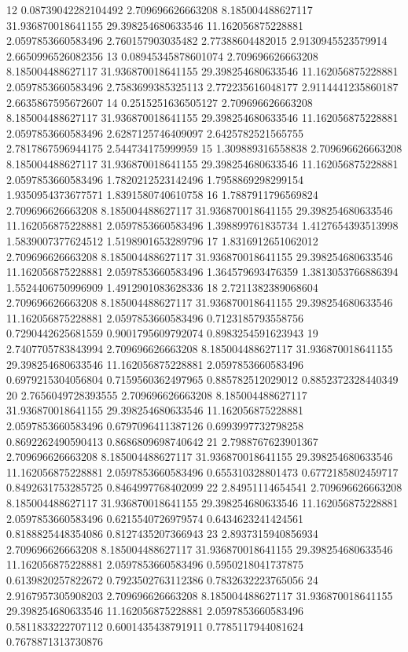 {12 0.08739042282104492 2.709696626663208 8.185004488627117 31.936870018641155 29.398254680633546 11.162056875228881 2.0597853660583496 2.760157903035482 2.77388604482015 2.9130945523579914 2.6650996526082356
13 0.08945345878601074 2.709696626663208 8.185004488627117 31.936870018641155 29.398254680633546 11.162056875228881 2.0597853660583496 2.7583699385325113 2.772235616048177 2.9114441235860187 2.6635867595672607
14 0.2515251636505127 2.709696626663208 8.185004488627117 31.936870018641155 29.398254680633546 11.162056875228881 2.0597853660583496 2.6287125746409097 2.6425782521565755 2.7817867596944175 2.544734175999959
15 1.309889316558838 2.709696626663208 8.185004488627117 31.936870018641155 29.398254680633546 11.162056875228881 2.0597853660583496 1.7820212523142496 1.7958869298299154 1.9350954373677571 1.8391580740610758
16 1.7887911796569824 2.709696626663208 8.185004488627117 31.936870018641155 29.398254680633546 11.162056875228881 2.0597853660583496 1.398899761835734 1.4127654393513998 1.5839007377624512 1.5198901653289796
17 1.8316912651062012 2.709696626663208 8.185004488627117 31.936870018641155 29.398254680633546 11.162056875228881 2.0597853660583496 1.364579693476359 1.3813053766886394 1.5524406750996909 1.4912901083628336
18 2.7211382389068604 2.709696626663208 8.185004488627117 31.936870018641155 29.398254680633546 11.162056875228881 2.0597853660583496 0.7123185793558756 0.7290442625681559 0.9001795609792074 0.8983254591623943
19 2.7407705783843994 2.709696626663208 8.185004488627117 31.936870018641155 29.398254680633546 11.162056875228881 2.0597853660583496 0.6979215304056804 0.7159560362497965 0.885782512029012 0.8852372328440349
20 2.7656049728393555 2.709696626663208 8.185004488627117 31.936870018641155 29.398254680633546 11.162056875228881 2.0597853660583496 0.6797096411387126 0.6993997732798258 0.8692262490590413 0.8686809698740642
21 2.7988767623901367 2.709696626663208 8.185004488627117 31.936870018641155 29.398254680633546 11.162056875228881 2.0597853660583496 0.655310328801473 0.6772185802459717 0.8492631753285725 0.8464997768402099
22 2.84951114654541 2.709696626663208 8.185004488627117 31.936870018641155 29.398254680633546 11.162056875228881 2.0597853660583496 0.6215540726979574 0.6434623241424561 0.8188825448354086 0.8127435207366943
23 2.8937315940856934 2.709696626663208 8.185004488627117 31.936870018641155 29.398254680633546 11.162056875228881 2.0597853660583496 0.5950218041737875 0.6139820257822672 0.7923502763112386 0.7832632223765056
24 2.9167957305908203 2.709696626663208 8.185004488627117 31.936870018641155 29.398254680633546 11.162056875228881 2.0597853660583496 0.5811833222707112 0.6001435438791911 0.7785117944081624 0.7678871313730876
}
